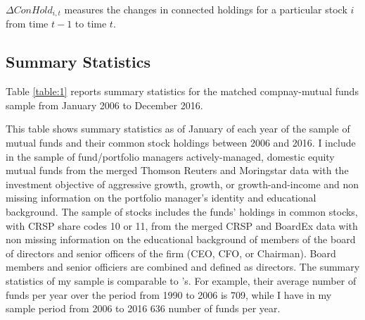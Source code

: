 \documentclass[11pt]{article}
\begin{document}
\begin{doublespace}
$\Delta ConHold_{i,t}$ measures the changes in connected holdings for a particular stock $i$ from time $t-1$ to time $t$.


\subsection{Summary Statistics}
Table \ref{table:1} reports summary statistics for the matched compnay-mutual funds sample from January 2006 to December 2016.  

  This table shows summary statistics as of January of each year of the sample of mutual funds and their common stock holdings between 2006 and 2016. I include in the sample of fund/portfolio managers actively-managed, domestic equity mutual funds from the merged Thomson Reuters and Moringstar data with the investment objective of aggressive growth, growth, or growth-and-income and non missing information on the portfolio manager's identity and educational background. The sample of stocks includes the funds' holdings in common stocks, with CRSP share codes 10 or 11, from the merged CRSP and BoardEx data with non missing information on the educational background of members of the board of directors and senior officers of the firm (CEO, CFO, or Chairman). Board members and senior officiers are combined and defined as directors. The summary statistics of my sample is comparable to \cite{cohen2008small} 's. For example, their average number of funds per year over the period from 1990 to 2006 is 709, while I have in my sample period from 2006 to 2016 636 number of funds per year. 



\end{doublespace}
\end{document}
